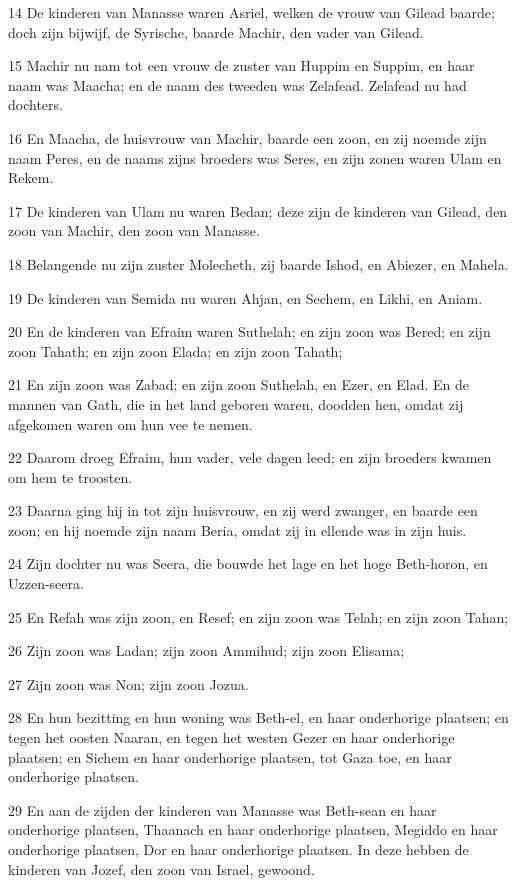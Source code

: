 \par 14 De kinderen van Manasse waren Asriel, welken de vrouw van Gilead baarde; doch zijn bijwijf, de Syrische, baarde Machir, den vader van Gilead.
\par 15 Machir nu nam tot een vrouw de zuster van Huppim en Suppim, en haar naam was Maacha; en de naam des tweeden was Zelafead. Zelafead nu had dochters.
\par 16 En Maacha, de huisvrouw van Machir, baarde een zoon, en zij noemde zijn naam Peres, en de naams zijns broeders was Seres, en zijn zonen waren Ulam en Rekem.
\par 17 De kinderen van Ulam nu waren Bedan; deze zijn de kinderen van Gilead, den zoon van Machir, den zoon van Manasse.
\par 18 Belangende nu zijn zuster Molecheth, zij baarde Ishod, en Abiezer, en Mahela.
\par 19 De kinderen van Semida nu waren Ahjan, en Sechem, en Likhi, en Aniam.
\par 20 En de kinderen van Efraim waren Suthelah; en zijn zoon was Bered; en zijn zoon Tahath; en zijn zoon Elada; en zijn zoon Tahath;
\par 21 En zijn zoon was Zabad; en zijn zoon Suthelah, en Ezer, en Elad. En de mannen van Gath, die in het land geboren waren, doodden hen, omdat zij afgekomen waren om hun vee te nemen.
\par 22 Daarom droeg Efraim, hun vader, vele dagen leed; en zijn broeders kwamen om hem te troosten.
\par 23 Daarna ging hij in tot zijn huisvrouw, en zij werd zwanger, en baarde een zoon; en hij noemde zijn naam Beria, omdat zij in ellende was in zijn huis.
\par 24 Zijn dochter nu was Seera, die bouwde het lage en het hoge Beth-horon, en Uzzen-seera.
\par 25 En Refah was zijn zoon, en Resef; en zijn zoon was Telah; en zijn zoon Tahan;
\par 26 Zijn zoon was Ladan; zijn zoon Ammihud; zijn zoon Elisama;
\par 27 Zijn zoon was Non; zijn zoon Jozua.
\par 28 En hun bezitting en hun woning was Beth-el, en haar onderhorige plaatsen; en tegen het oosten Naaran, en tegen het westen Gezer en haar onderhorige plaatsen; en Sichem en haar onderhorige plaatsen, tot Gaza toe, en haar onderhorige plaatsen.
\par 29 En aan de zijden der kinderen van Manasse was Beth-sean en haar onderhorige plaatsen, Thaanach en haar onderhorige plaatsen, Megiddo en haar onderhorige plaatsen, Dor en haar onderhorige plaatsen. In deze hebben de kinderen van Jozef, den zoon van Israel, gewoond.
